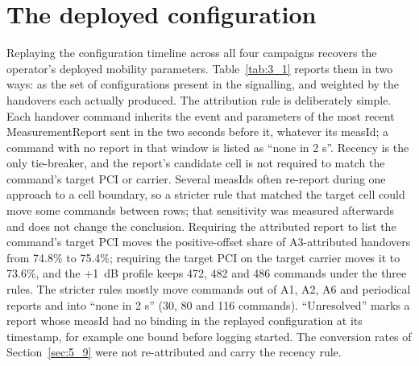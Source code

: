 \section{The deployed configuration}
\label{sec:3_5}

Replaying the configuration timeline across all four campaigns recovers the operator's deployed mobility parameters. Table~\ref{tab:3_1} reports them in two ways: as the set of configurations present in the signalling, and weighted by the handovers each actually produced. The attribution rule is deliberately simple. Each handover command inherits the event and parameters of the most recent MeasurementReport sent in the two seconds before it, whatever its measId; a command with no report in that window is listed as ``none in 2 s''. Recency is the only tie-breaker, and the report's candidate cell is not required to match the command's target PCI or carrier. Several measIds often re-report during one approach to a cell boundary, so a stricter rule that matched the target cell could move some commands between rows; that sensitivity was measured afterwards and does not change the conclusion. Requiring the attributed report to list the command's target PCI moves the positive-offset share of A3-attributed handovers from 74.8\% to 75.4\%; requiring the target PCI on the target carrier moves it to 73.6\%, and the +1~dB profile keeps 472, 482 and 486 commands under the three rules. The stricter rules mostly move commands out of A1, A2, A6 and periodical reports and into ``none in 2 s'' (30, 80 and 116 commands). ``Unresolved'' marks a report whose measId had no binding in the replayed configuration at its timestamp, for example one bound before logging started. The conversion rates of Section~\ref{sec:5_9} were not re-attributed and carry the recency rule.


